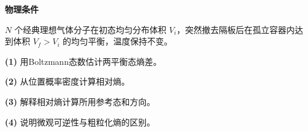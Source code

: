 \textbf{物理条件}\par \(N\) 个经典理想气体分子在初态均匀分布体积 \(V_i\)，突然撤去隔板后在孤立容器内达到体积 \(V_f>V_i\) 的均匀平衡，温度保持不变。
\par\noindent\textbf{(1)} 用Boltzmann态数估计两平衡态熵差。
\par\noindent\textbf{(2)} 从位置概率密度计算相对熵。
\par\noindent\textbf{(3)} 解释相对熵计算所用参考态和方向。
\par\noindent\textbf{(4)} 说明微观可逆性与粗粒化熵的区别。
